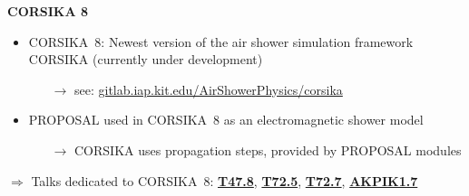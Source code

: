 \begin{frame}[c]
    \begin{columns}[onlytextwidth]
    \begin{column}{0.6\textwidth}
    \textbf{CORSIKA 8}
        \begin{itemize}
            \item CORSIKA~8: Newest version of the air shower simulation framework CORSIKA (currently under development)
            \begin{itemize}
                \item[$\rightarrow$] see: \url{gitlab.iap.kit.edu/AirShowerPhysics/corsika}
            \end{itemize}
            \item PROPOSAL used in CORSIKA~8 as an electromagnetic shower model
            \begin{itemize}
                \item[$\rightarrow$] CORSIKA uses propagation steps, provided by PROPOSAL modules
            \end{itemize}
        \end{itemize}

        \hspace{10pt} $\Rightarrow$ Talks dedicated to CORSIKA~8: \href{https://www.dpg-verhandlungen.de/year/2022/conference/heidelberg/part/t/session/47/contribution/8}{\textbf{T47.8}}, \href{https://www.dpg-verhandlungen.de/year/2022/conference/heidelberg/part/t/session/72/contribution/5}{\textbf{T72.5}}, \href{https://www.dpg-verhandlungen.de/year/2022/conference/heidelberg/part/t/session/72/contribution/7}{\textbf{T72.7}}, \href{https://www.dpg-verhandlungen.de/year/2022/conference/heidelberg/part/akpik/session/1/contribution/7}{\textbf{AKPIK1.7}}


\end{column}
\end{columns}
\end{frame}
